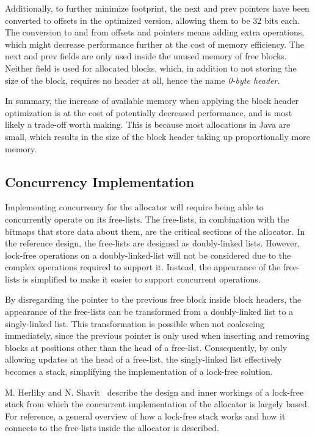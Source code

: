 Additionally, to further minimize footprint, the next and prev pointers have been converted to offsets in the optimized version, allowing them to be 32 bits each. The conversion to and from offsets and pointers means adding extra operations, which might decrease performance further at the cost of memory efficiency.  The next and prev fields are only used inside the unused memory of free blocks. Neither field is used for allocated blocks, which, in addition to not storing the size of the block, requires no header at all, hence the name \textit{0-byte header}.

In summary, the increase of available memory when applying the block header optimization is at the cost of potentially decreased performance, and is most likely a trade-off worth making. This is because most allocations in Java are small, which results in the size of the block header taking up proportionally more memory.

\subsection{Concurrency Implementation}
\label{sec:adaptations_impl:concurrency}

Implementing concurrency for the allocator will require being able to concurrently operate on its free-lists. The free-lists, in combination with the bitmaps that store data about them, are the critical sections of the allocator. In the reference design, the free-lists are designed as doubly-linked lists. However, lock-free operations on a doubly-linked-list will not be considered due to the complex operations required to support it. Instead, the appearance of the free-lists is simplified to make it easier to support concurrent operations.

By disregarding the pointer to the previous free block inside block headers, the appearance of the free-lists can be transformed from a doubly-linked list to a singly-linked list. This transformation is possible when not coalescing immediately, since the previous pointer is only used when inserting and removing blocks at positions other than the head of a free-list. Consequently, by only allowing updates at the head of a free-list, the singly-linked list effectively becomes a stack, simplifying the implementation of a lock-free solution.

M. Herlihy and N. Shavit~\cite[Chapter 11]{artofmpprogramming} describe the design and inner workings of a lock-free stack from which the concurrent implementation of the allocator is largely based. For reference, a general overview of how a lock-free stack works and how it connects to the free-lists inside the allocator is described.

